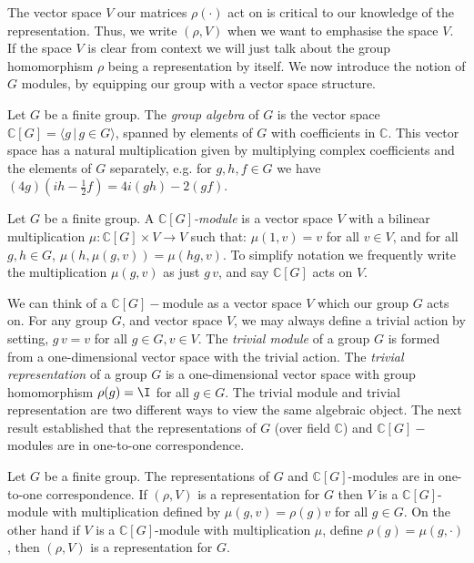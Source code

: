 \documentclass[11pt]{report}
\begin{document}
The vector space $V$ our matrices $\rho(\cdot)$ act on is critical to our knowledge of the representation. Thus, we write $(\rho,V)$ when we want to emphasise the space $V$. If the space $V$ is clear from 
context we will just talk about the group homomorphism $\rho$ being a representation by itself. 
We now introduce the notion of $G$ modules, by equipping our group with a vector space structure.

\begin{defn}
	Let $G$ be a finite group. The \emph{group algebra} of $G$ is the vector space $\mathbb{C}[G] = \langle g \, | \, g \in G 
	\rangle$, spanned by elements of $G$ with coefficients in $\mathbb{C}$. This vector space has a natural multiplication	given by multiplying complex coefficients and the elements of $G$ separately, e.g. for $g,h,f \in G$ we have $(4g) 
	(ih  - \frac{1}{2}f) = 4i(gh) - 2(gf)$.
\end{defn}



\begin{defn}
	Let $G$ be a finite group. A \emph{$\mathbb{C}[G]$-module}  is a vector space $V$ with a 
	bilinear multiplication $\mu:\mathbb{C}[G]\times V \to V$ such that: $\mu(1,v) = v$ for all 
	$v\in V$, and for all $g,h \in G$, $\mu(h,\mu(g,v)) = \mu(hg,v)$. To simplify notation we frequently write the multiplication $\mu(g,v)$ as just $g \, v$, and say $\mathbb{C}[G]$ acts on $V$. 
\end{defn}

We can think of a $\mathbb{C}[G]-$module as a vector space $V$ which our group $G$ acts on. For any group $G$, and vector space $V$, we may always define a trivial action by setting, $g \, v = v$ for all $g \in G, v\in V$. The \emph{trivial module} of a group $G$ is formed from a one-dimensional vector space with the trivial action. The \emph{trivial representation} of a group $G$ is a one-dimensional vector space with group homomorphism $\rho(g) = \I $ for all $g \in G$. The trivial module and trivial representation are two different ways to view the same algebraic object. The next result established that the representations of $G$ (over field $\mathbb{C}$) and $\mathbb{C}[G]-$modules are in one-to-one correspondence.

\begin{thm}
	\label{chpt3:thm:1to1}
	Let $G$ be a finite group. The representations of $G$ and  $\mathbb{C}[G]$-modules are in one-to-one 
	correspondence. If $(\rho,V)$ is a representation for $G$ then $V$ is a $\mathbb{C}[G]$-module with multiplication defined by $\mu(g,v) = \rho(g)v$ for all $g \in G$. On the 
	other hand if $V$ is a $\mathbb{C}[G]$-module with multiplication $\mu$, define $\rho(g) = 
	\mu(g,\cdot)$, then $(\rho,V)$ is a representation for $G$. 
	
	
	
\end{thm}
\end{document}
